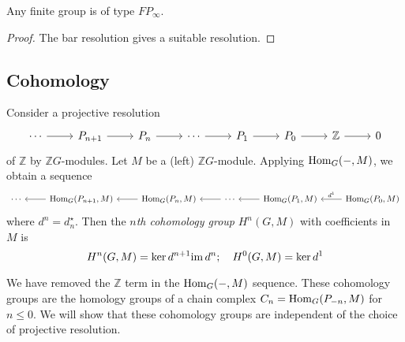 \begin{corollary}
    Any finite group is of type \( FP_\infty \).
\end{corollary}
\begin{proof}
    The bar resolution gives a suitable resolution.
\end{proof}

\subsection{Cohomology}
\begin{definition}
    Consider a projective resolution
\[\begin{tikzcd}
	\cdots & {P_{n+1}} & {P_n} & \cdots & {P_1} & {P_0} & {\mathbb Z} & 0
	\arrow[from=1-1, to=1-2]
	\arrow[from=1-2, to=1-3]
	\arrow[from=1-3, to=1-4]
	\arrow[from=1-4, to=1-5]
	\arrow[from=1-5, to=1-6]
	\arrow[from=1-6, to=1-7]
	\arrow[from=1-7, to=1-8]
\end{tikzcd}\]
    of \( \mathbb Z \) by \( \mathbb Z G \)-modules.
    Let \( M \) be a (left) \( \mathbb Z G \)-module.
    Applying \( \operatorname{Hom}_G(-,M) \), we obtain a sequence
\[\begin{tikzcd}
	\cdots & {\Hom_G(P_{n+1},M)} & {\Hom_G(P_n,M)} & \cdots & {\Hom_G(P_1,M)} & {\Hom_G(P_0,M)}
	\arrow[from=1-2, to=1-1]
	\arrow[from=1-3, to=1-2]
	\arrow[from=1-4, to=1-3]
	\arrow[from=1-5, to=1-4]
	\arrow["{d^1}"', from=1-6, to=1-5]
\end{tikzcd}\]
    where \( d^n = d_n^\star \).
    Then the \emph{\( n \)th cohomology group} \( H^n(G, M) \) with coefficients in \( M \) is
    \[ H^n(G, M) = {\ker d^{n+1}}{\operatorname{im} d^n};\quad H^0(G, M) = \ker d^1 \]
\end{definition}
\begin{remark}
    We have removed the \( \mathbb Z \) term in the \( \operatorname{Hom}_G(-, M) \) sequence.
    These cohomology groups are the homology groups of a chain complex \( C_n = \operatorname{Hom}_G(P_{-n}, M) \) for \( n \leq 0 \).
    We will show that these cohomology groups are independent of the choice of projective resolution.
\end{remark}
